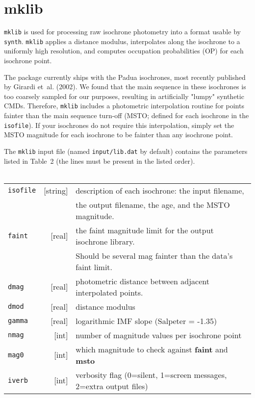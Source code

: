 \documentclass[12pt]{book}
\def\ttg{\tt\color{DarkGreen}}
\def\tto{\tt\color{myOrange}}
\begin{document}
\chapter{mklib}\label{ch:lib}

{\ttg mklib} is used for processing raw isochrone photometry into a 
format usable by {\ttg synth}.  {\ttg mklib} applies a distance modulus, 
interpolates along the isochrone to a uniformly high resolution, and 
computes occupation probabilities (OP) for each isochrone point.

The package currently ships with the Padua isochrones, most recently
published by Girardi et~al. (2002).  We found that the main sequence 
in these isochrones is too coarsely sampled for our purposes, 
resulting in artificially "lumpy" synthetic CMDs. Therefore,  
{\ttg mklib} includes a photometric interpolation routine for points 
fainter than the main sequence turn-off (MSTO; defined for each 
isochrone in the {\tto isofile}).  If your isochrones do not require 
this interpolation, simply set the MSTO magnitude for each isochrone 
to be fainter than any isochrone point.  

\bigskip
The {\ttg mklib} input file (named {\ttg input/lib.dat} by default) 
contains the parameters listed in Table~2 (the lines 
must be present in the listed order). \\

 \\
{\scriptsize
\begin{tabular}{|lr|l|}
\hline
{\tto isofile} &[string]& description of each isochrone: the input filename, \\
               &        & the output filename, the age, and the MSTO magnitude. \\
{\tto faint}   & [real] & the faint magnitude limit for the output isochrone library.\\
               &        & Should be several mag fainter than the data's faint limit. \\
{\tto dmag}    & [real] & photometric distance between adjacent interpolated points.\\
{\tto dmod}    & [real] & distance modulus \\
{\tto gamma}   & [real] & logarithmic IMF slope (Salpeter = -1.35) \\
{\tto nmag}    &  [int] & number of magnitude values per isochrone point \\
{\tto mag0}    &  [int] & which magnitude to check against {\bf faint} and  {\bf msto} \\
{\tto iverb}   &  [int] & verbosity flag (0=silent, 1=screen messages, 2=extra output files)  \\
\hline
\end{tabular}
}
\end{document}
